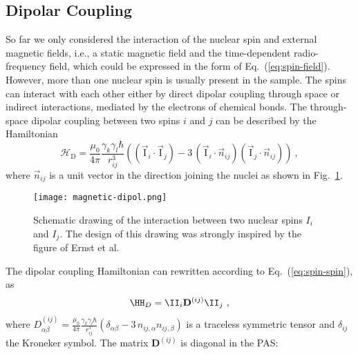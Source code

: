 \subsection{Dipolar Coupling}
So far we only considered the interaction of the nuclear spin and external magnetic fields, i.e., a static magnetic field and the time-dependent radio-frequency field, which could be expressed in the form of Eq.~(\ref{eq:spin-field}).
However, more than one nuclear spin is usually present in the sample. The spins can interact with each other either by direct dipolar coupling through space or indirect interactions, mediated by the electrons of chemical bonds.
The through-space dipolar coupling between two spins $i$ and $j$ can be described by the Hamiltonian
\begin{equation}
\mathcal{{H}}_{\textrm{D}}= \frac{\mu_0}{4\pi} \frac{\gamma_k\gamma_l \hbar}{r_{ij}^3}   \left((\vec {{\textrm{I}}}_{i}\cdot \vec{{\textrm{I}}}_{j})-3\, (\vec {{\textrm{I}}}_{i} \cdot \vec n_{ij})(\vec {{\textrm{I}}}_{j} \cdot \vec n_{ij})\right)~,
\label{eq:dip_coup_homo}
\end{equation}
where $\vec{n}_{ij}$ is a unit vector in the direction joining the nuclei as shown in Fig.~\ref{fig:intro-magnetic-dipol}.
\begin{figure}[ht]
  \centering
  \texttt{[image: magnetic-dipol.png]}
  \caption{Schematic drawing of the interaction between two nuclear spins $I_i$ and $I_j$. The design of this drawing was strongly inspired by the figure of Ernst et al. \cite{Script}}
  \label{fig:intro-magnetic-dipol}
\end{figure}
The dipolar coupling Hamiltonian can rewritten according to Eq.~(\ref{eq:spin-spin}), as 
\begin{align}
  \label{eq:dipolar-coupling-Hamiltonian}
  \HH_D = \II_i \mathbf{D}^{(ij)} \II_j~,
\end{align}
where $D_{\alpha\beta}^{(ij)} =  \frac{\mu_0}{4\pi} \frac{\gamma_k\gamma_l \hbar}{r_{ij}^3}(\delta_{\alpha\beta}- 3\, n_{ij,\alpha} n_{ij,\beta})$ is a traceless symmetric tensor and $\delta_{ij}$ the Kroneker symbol. The matrix $\mathbf{D}^{(ij)}$ is diagonal in the PAS:
